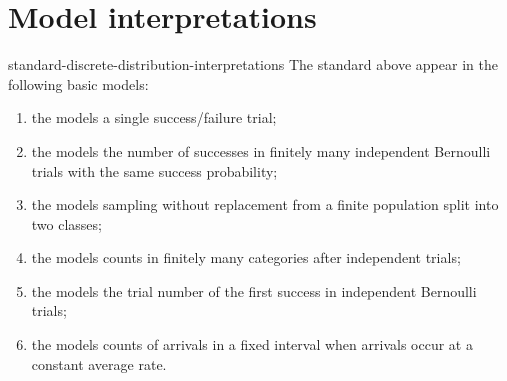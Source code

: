 \documentclass[preview]{standalone}
\begin{document}
\section{Model interpretations}

\begin{snippet}{standard-discrete-distribution-interpretations}
    The standard  above appear
    in the following basic models:
    \begin{enumerate}
        \item the \bernoullidistribution models a single success/failure
            trial;
        \item the \binomialdistribution models the number of successes in
            finitely many independent Bernoulli trials with the same success
            probability;
        \item the \hypergeometricdistribution models sampling without
            replacement from a finite population split into two classes;
        \item the \multinomialdistribution models counts in finitely many
            categories after independent trials;
        \item the \geometricdistribution models the trial number of the first
            success in independent Bernoulli trials;
        \item the \poissondistribution models counts of arrivals in a fixed
            interval when arrivals occur at a constant average rate.
    \end{enumerate}
\end{snippet}
\end{document}
